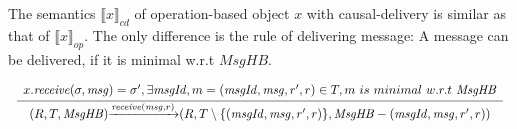 The semantics $\llbracket x \rrbracket_{\mathit{cd}}$ of operation-based object $x$ with causal-delivery is similar as that of $\llbracket x \rrbracket_{\mathit{op}}$. The only difference is the rule of delivering message: A message can be delivered, if it is minimal w.r.t $\mathit{MsgHB}$.

$\begin{array}{l c}
   \bigfrac{
   \begin{array}{c}
      x.\mathit{receive}(\sigma,\mathit{msg}) = \sigma',\exists \mathit{msgId}, m = (\mathit{msgId},\mathit{msg},r',r) \in T, m \ is \ minimal \ w.r.t \ \mathit{MsgHB}
   \end{array}}
     {(R,T,\mathit{MsgHB}) {\xrightarrow{\mathit{receive}(\mathit{msg},r)}} (R,T \setminus \{ (\mathit{msgId},\mathit{msg},r',r) \},\mathit{MsgHB} - (\mathit{msgId},\mathit{msg},r',r) )}
\end{array}$

